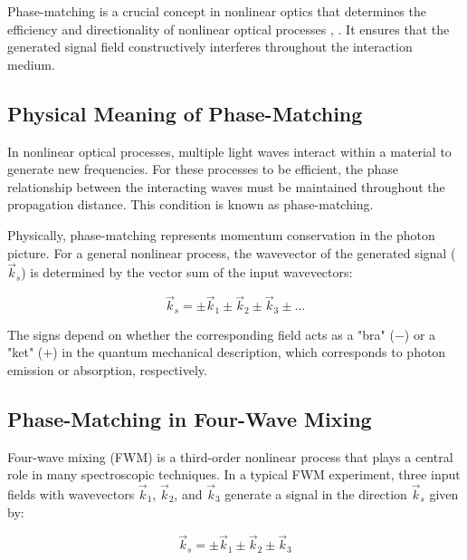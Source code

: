\noindent Phase-matching is a crucial concept in nonlinear optics that determines the efficiency and directionality of nonlinear optical processes \cite{boyd2008contents},  . It ensures that the generated signal field constructively interferes throughout the interaction medium.

\subsection{Physical Meaning of Phase-Matching}
\label{subsec:phase_matching_meaning}

\noindent In nonlinear optical processes, multiple light waves interact within a material to generate new frequencies. For these processes to be efficient, the phase relationship between the interacting waves must be maintained throughout the propagation distance. This condition is known as phase-matching.

\noindent Physically, phase-matching represents momentum conservation in the photon picture. For a general nonlinear process, the wavevector of the generated signal ($\vec{k}_s$) is determined by the vector sum of the input wavevectors:

\begin{equation}
	\vec{k}_s = \pm\vec{k}_1 \pm\vec{k}_2 \pm\vec{k}_3 \pm \ldots
	\label{eq:phase_matching}
\end{equation}

\noindent The signs depend on whether the corresponding field acts as a "bra" ($-$) or a "ket" ($+$) in the quantum mechanical description, which corresponds to photon emission or absorption, respectively.

\subsection{Phase-Matching in Four-Wave Mixing}
\label{subsec:fwm_phase_matching}

\noindent Four-wave mixing (FWM) is a third-order nonlinear process that plays a central role in many spectroscopic techniques. In a typical FWM experiment, three input fields with wavevectors $\vec{k}_1$, $\vec{k}_2$, and $\vec{k}_3$ generate a signal in the direction $\vec{k}_s$ given by:

\begin{equation}
	\vec{k}_s = \pm\vec{k}_1 \pm\vec{k}_2 \pm\vec{k}_3
	\label{eq:fwm_phase_matching}
\end{equation}

